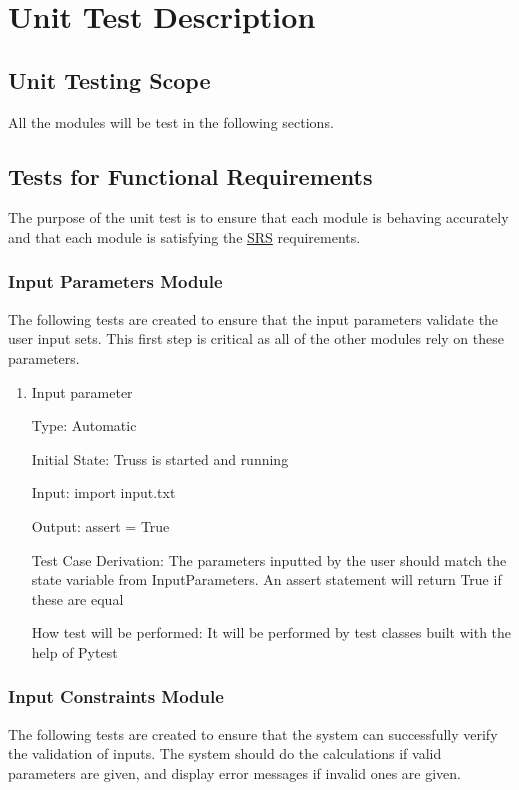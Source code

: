 \documentclass[12pt, titlepage]{article}
\begin{document}
\section{Unit Test Description} \label{unitdescript}

\subsection{Unit Testing Scope}
All the modules will be test in the following sections.

\subsection{Tests for Functional Requirements}
The purpose of the unit test is to ensure that each module is behaving 
accurately and that each module is satisfying the 
\href{https://github.com/tingyuw/cas741/blob/master/docs/SRS/SRS.pdf}{SRS} 
requirements.

\subsubsection{Input Parameters Module} \label{inParam}
The following tests are created to ensure that the input parameters validate 
the user input sets. This first step is critical as all of the other
modules rely on these parameters.

\begin{enumerate}
\item{Input parameter\\}
	
	Type: Automatic
	
	Initial State: Truss is started and running
	
	Input: import input.txt 
	
	Output: assert = True
	
	Test Case Derivation: The parameters inputted by the user should match the
	state variable from InputParameters. An assert statement will return True 
	if these are equal
	
	How test will be performed: It will be performed by test classes built with 
	the help of Pytest
\end{enumerate}

\subsubsection{Input Constraints Module} \label{inConst}
The following tests are created to ensure that the system can successfully 
verify the validation of inputs. The system should do the calculations if valid 
parameters are given, and display error messages if invalid ones are given.
\end{document}
